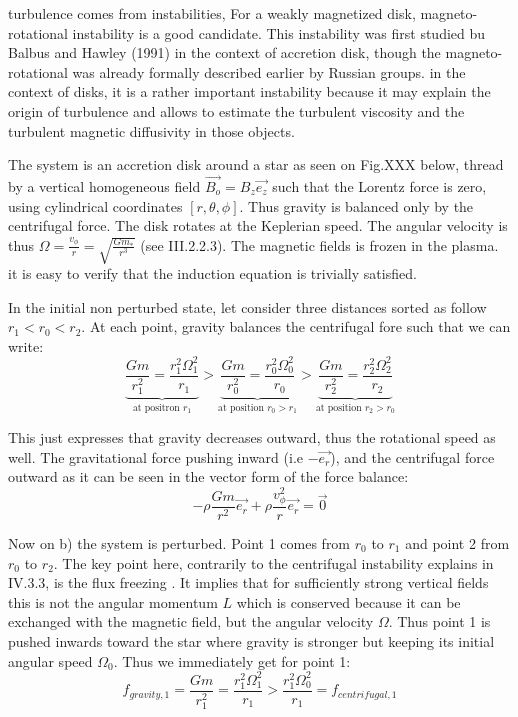 \documentclass[10pt,a4paper,english]{article}
\begin{document}
turbulence comes from instabilities, For a weakly magnetized disk,
magneto-rotational instability is a good candidate. This instability was first
studied bu Balbus and Hawley  (1991) in the context of accretion disk, though
the magneto-rotational was already formally described earlier by Russian
groups. in the context of disks, it is a rather important instability because
it may explain the origin of turbulence and allows to estimate the turbulent
viscosity  and the turbulent magnetic diffusivity in those objects.


The system is an accretion disk around a star as seen on Fig.XXX below, thread
by a vertical homogeneous field $\vec{B_o} = B_z\vec{e_z}$ such that the
Lorentz force is zero, using cylindrical coordinates $[r,\theta,\phi]$. Thus
gravity is balanced only by the centrifugal force. The disk rotates  at the
Keplerian speed. The angular velocity is thus $\Omega = \frac{v_{\phi}}{r} =
\sqrt{\frac{Gm_*}{r^3}}$ (see III.2.2.3). The magnetic fields is frozen in
the plasma. it is easy to verify that the induction equation is trivially
satisfied.


In the initial non perturbed state, let consider three distances sorted as
follow $r_1 < r_0 < r_2 $. At each point, gravity balances the centrifugal fore
such that we can write:
\begin{equation}
    \underbrace{\frac{Gm}{r_1^2} = \frac{r_1^2\Omega_1^2}{r_1}}_{\text{at positron  } r_1} >
    \underbrace{\frac{Gm}{r_0^2} = \frac{r_0^2\Omega_0^2}{r_0}}_{\text{at position }r_0 > r_1}	>
    \underbrace{\frac{Gm}{r_2^2} = \frac{r_2^2\Omega_2^2}{r_2}}_{\text{at position }r_2 > r_0}
\end{equation}

This just expresses that gravity decreases outward, thus the rotational speed
as well. The gravitational force pushing inward (i.e $-\vec{e_r}$), and the
centrifugal force  outward as it can be seen in the vector form of the force
balance:
\begin{equation}
    -\rho\frac{Gm}{r^2}\vec{e_r} + \rho\frac{v_{\phi}^2}{r}\vec{e_r} = \vec{0}
\end{equation}

Now on b) the system is perturbed. Point 1 comes from $r_0$ to $r_1$ and point
2 from $r_0$ to $r_2$. The key point here, contrarily to the centrifugal
instability explains in IV.3.3, is the flux freezing . It implies that for
sufficiently strong vertical fields this is not the angular momentum $ L$ which
is conserved because it can be exchanged with the magnetic field, but the
angular velocity $\Omega$. Thus point 1 is pushed inwards toward the star where
gravity is stronger but keeping its initial angular speed $\Omega_0$. Thus we
immediately get for point 1:
\begin{equation}
    f_{gravity,1} = \frac{Gm}{r_1^2} = \frac{r_1^2\Omega_1^2	}{r_1} >
    \frac{r_1^2\Omega_0^2}{r_1} = f_{centrifugal,1}
\end{equation}
\end{document}
